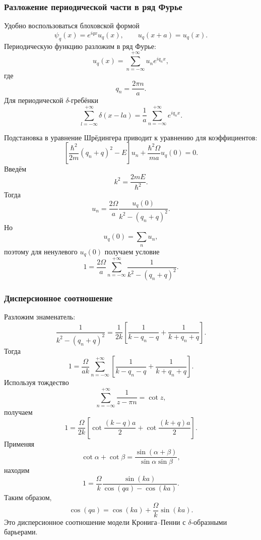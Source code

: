 \documentclass[12pt,a4paper]{article}
\begin{document}
\subsubsection{Разложение периодической части в ряд Фурье}

Удобно воспользоваться блоховской формой
\[
    \psi_q(x)
    =
    e^{iqx}u_q(x),
    \qquad
    u_q(x+a)=u_q(x).
\]
Периодическую функцию разложим в ряд Фурье:
\[
    \boxed{
        u_q(x)
        =
        \sum_{n=-\infty}^{+\infty}
        u_n e^{iq_nx}
    },
\]
где
\[
    \boxed{
        q_n=\frac{2\pi n}{a}
    }.
\]
Для периодической $\delta$-гребёнки
\[
    \sum_{l=-\infty}^{+\infty}\delta(x-la)
    =
    \frac1a
    \sum_{n=-\infty}^{+\infty}
        e^{iq_nx}.
\]

Подстановка в уравнение Шрёдингера приводит к уравнению для
коэффициентов:
\[
    \left[
        \frac{\hbar^2}{2m}
        (q_n+q)^2-E
    \right]u_n
    +
    \frac{\hbar^2\Omega}{ma}u_q(0)
    =
    0.
\]
Введём
\[
    k^2=\frac{2mE}{\hbar^2}.
\]
Тогда
\[
    \boxed{
        u_n
        =
        \frac{2\Omega}{a}
        \frac{u_q(0)}
        {k^2-(q_n+q)^2}
    }.
\]
Но
\[
    u_q(0)=\sum_nu_n,
\]
поэтому для ненулевого $u_q(0)$ получаем условие
\[
    \boxed{
        1
        =
        \frac{2\Omega}{a}
        \sum_{n=-\infty}^{+\infty}
        \frac{1}
        {k^2-(q_n+q)^2}
    }.
\]


\subsubsection{Дисперсионное соотношение}

Разложим знаменатель:
\[
    \frac{1}{k^2-(q_n+q)^2}
    =
    \frac{1}{2k}
    \left[
        \frac{1}{k-q_n-q}
        +
        \frac{1}{k+q_n+q}
    \right].
\]
Тогда
\[
    1
    =
    \frac{\Omega}{ak}
    \sum_{n=-\infty}^{+\infty}
    \left[
        \frac{1}{k-q_n-q}
        +
        \frac{1}{k+q_n+q}
    \right].
\]
Используя тождество
\[
    \sum_{n=-\infty}^{+\infty}
    \frac{1}{z-\pi n}
    =
    \cot z,
\]
получаем
\[
    1
    =
    \frac{\Omega}{2k}
    \left[
        \cot\frac{(k-q)a}{2}
        +
        \cot\frac{(k+q)a}{2}
    \right].
\]
Применяя
\[
    \cot\alpha+\cot\beta
    =
    \frac{\sin(\alpha+\beta)}
         {\sin\alpha\sin\beta},
\]
находим
\[
    1
    =
    \frac{\Omega}{k}
    \frac{\sin(ka)}
         {\cos(qa)-\cos(ka)}.
\]
Таким образом,
\[
    \boxed{
        \cos(qa)
        =
        \cos(ka)
        +
        \frac{\Omega}{k}\sin(ka)
    }.
\]
Это дисперсионное соотношение модели Кронига--Пенни с
$\delta$-образными барьерами.
\end{document}
